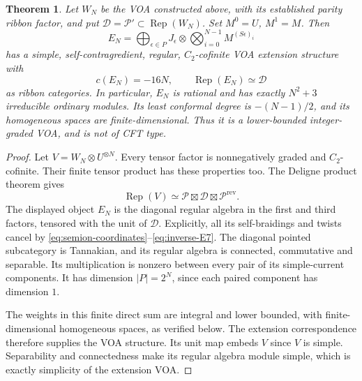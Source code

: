 \documentclass[11pt,a4paper]{article}
\numberwithin{equation}{section}
\newtheorem{theorem}{Theorem}[section]
\theoremstyle{definition}\newtheorem{definition}[theorem]{Definition}
\theoremstyle{remark}\newtheorem{remark}[theorem]{Remark}
\begin{document}
\begin{theorem}\label{thm:parity-cancellation-voa}
Let $W_N$ be the VOA constructed above, with its established parity
ribbon factor, and put
$\mathcal D=\mathcal P'\subset\operatorname{Rep}(W_N)$.
Set $M^0=U$, $M^1=M$. Then
\[
 E_N=\bigoplus_{\epsilon\in P}
       J_\epsilon\otimes\bigotimes_{i=0}^{N-1}M^{(S\epsilon)_i}
\]
has a simple, self-contragredient, regular, $C_2$-cofinite VOA
extension structure with
\[
 c(E_N)=-16N,\qquad
 \operatorname{Rep}(E_N)\simeq\mathcal D
\]
as ribbon categories. In particular, $E_N$ is rational and has
exactly $N^2+3$ irreducible ordinary modules. Its least conformal
degree is $-(N-1)/2$, and its homogeneous spaces are finite-dimensional.
Thus it is a lower-bounded integer-graded VOA, and is not of CFT type.
\end{theorem}
\begin{proof}
Let $V=W_N\otimes U^{\otimes N}$.
Every tensor factor is nonnegatively graded and $C_2$-cofinite.
Their finite tensor product has these properties too. The Deligne
product theorem \cite[Theorem 5.1]{c:McRaeDeligne} gives
\[
 \operatorname{Rep}(V)
 \simeq\mathcal P\boxtimes\mathcal D\boxtimes\mathcal P^{\mathrm{rev}}.
\]
The displayed object $E_N$ is the diagonal regular algebra in the
first and third factors, tensored with the unit of $\mathcal D$.
Explicitly, all its self-braidings and twists cancel by
\eqref{eq:semion-coordinates}--\eqref{eq:inverse-E7}.
The diagonal pointed subcategory is Tannakian, and its regular
algebra is connected, commutative and separable.
Its multiplication is nonzero between every pair of its simple-current
components. It has dimension $|P|=2^N$, since each paired component
has dimension $1$.

The weights in this finite direct sum are integral and lower bounded,
with finite-dimensional homogeneous spaces, as verified below.
The extension correspondence
\cite[Theorem 7.5]{cmy} therefore supplies the VOA structure.
Its unit map embeds $V$ since $V$ is simple. Separability and
connectedness make its regular algebra module simple, which is
exactly simplicity of the extension VOA.


\end{proof}
\end{document}
